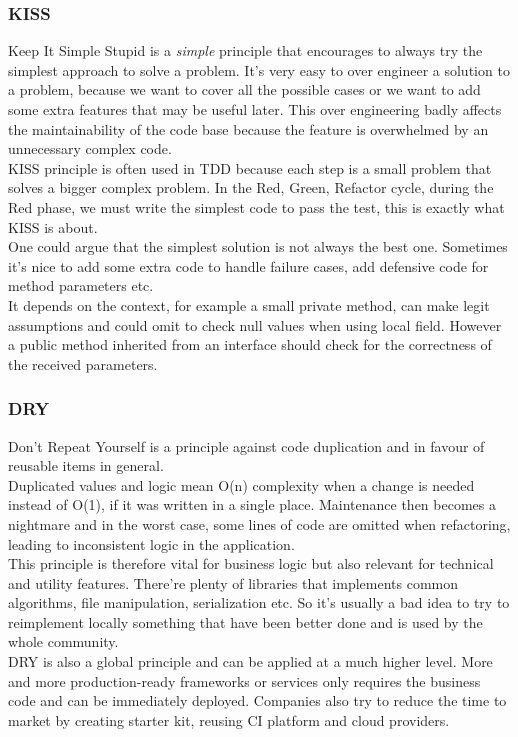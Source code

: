 \subsubsection{KISS}
Keep It Simple Stupid is a \textit{simple} principle that encourages to
always try the simplest approach to solve a problem.
It's very easy to over engineer a solution to a problem, because we want
to cover all the possible cases or we want to add some extra
features that may be useful later.
This over engineering badly affects the maintainability of the code base
because the feature is overwhelmed by an unnecessary complex code. \\
\newline
KISS principle is often used in TDD because each step is a small
problem that solves a bigger complex problem.
In the Red, Green, Refactor cycle, during the Red phase, we must write
the simplest code to pass the test, this is exactly what KISS is about.
\\
\newline
One could argue that the simplest solution is not always the best one.
Sometimes it's nice to add some extra code to handle failure cases, add
defensive code for method parameters etc. \\
It depends on the context, for example a small private method, can make
legit assumptions and could omit to check null values when using
local field.
However a public method inherited from an interface should check for the
correctness of the received parameters.

\subsubsection{DRY}
Don't Repeat Yourself is a principle against code duplication and in
favour of reusable items in general. \\
Duplicated values and logic mean O(n) complexity when a change is needed
instead of O(1), if it was written in a single place.
Maintenance then becomes a nightmare and in the worst case, some lines of
code are omitted when refactoring, leading to inconsistent logic in the
application. \\
\newline
This principle is therefore vital for business logic but also relevant
for technical and utility features.
There're plenty of libraries that implements common algorithms, file
manipulation, serialization etc.
So it's usually a bad idea to try to reimplement locally something that
have been better done and is used by the whole community. \\
\newline
DRY is also a global principle and can be applied at a much higher level.
More and more production-ready frameworks or services only requires
the business code and can be immediately deployed.
Companies also try to reduce the time to market by creating starter kit,
reusing CI platform and cloud providers.

